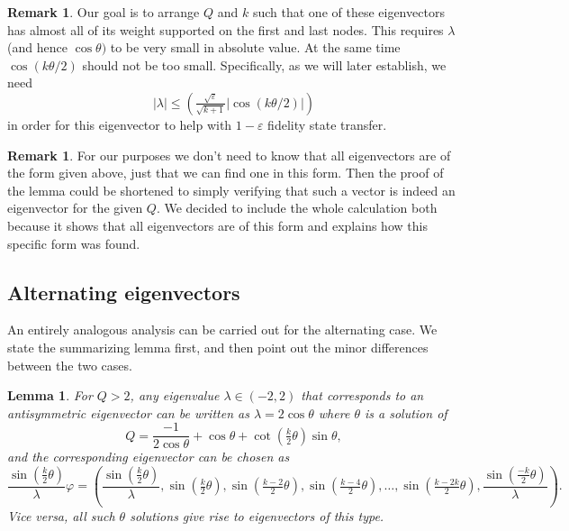 \documentclass{article}
\newtheorem{lemma}[theorem]{Lemma}
\theoremstyle{definition}
\newtheorem{rmk}[theorem]{Remark}
\numberwithin{equation}{section}
\numberwithin{theorem}{section}
\newcommand{\ep}{\varepsilon}
\begin{document}
\begin{rmk}
    Our goal is to arrange $Q$ and $k$ such that one of these eigenvectors has almost all of its weight supported on the first and last nodes. This requires $\lambda$ (and hence $\cos \theta)$ to be very small in absolute value. At the same time $\cos(k\theta/2 )$ should not be too small. Specifically, as we will later establish, we need 
    \[|\lambda| \leq \left(\tfrac{\sqrt{\ep}}{\sqrt{k+1}} |\cos(k\theta/2)|\right)\] 
    in order for this eigenvector to help with $1-\ep$ fidelity state transfer.
\end{rmk}

\begin{rmk}
    For our purposes we don't need to know that all eigenvectors are of the form given above, just that we can find one in this form. Then the proof of the lemma could be shortened to simply verifying that such a vector is indeed an eigenvector for the given $Q$. We decided to include the whole calculation both because it shows that all eigenvectors are of this form and explains how this specific form was found.
\end{rmk}

\subsection{Alternating eigenvectors}

An entirely analogous analysis can be carried out for the alternating case. We state the summarizing lemma first, and then point out the minor differences between the two cases.

\begin{lemma}\label{lem:alt_case}
    For $Q > 2$, any eigenvalue $\lambda \in (-2,2)$ that corresponds to an antisymmetric eigenvector can be written as $\lambda = 2\cos \theta$ where $\theta$ is a solution of 
\[    Q =  \frac{-1}{2\cos \theta}+\cos \theta + \cot \left(\tfrac{k}{2}\theta\right)\sin \theta, \] 
and the corresponding eigenvector can be chosen as 
\[ \frac{\sin(\tfrac{k}{2}\theta)}{\lambda}\varphi = \left(\frac{\sin(\tfrac{k}{2}\theta)}{\lambda}, \sin(\tfrac{k}{2}\theta),\sin(\tfrac{k-2}{2}\theta),\sin(\tfrac{k-4}{2}\theta),\dots, \sin(\tfrac{k-2k}{2}\theta),\frac{\sin(\tfrac{-k}{2}\theta)}{\lambda}\right).\]
Vice versa, all such $\theta$ solutions give rise to eigenvectors of this type.
\end{lemma}
\end{document}
